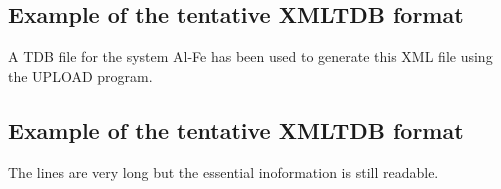 \documentclass[12pt]{article}
\begin{document}
\begin{appendices}
\setcounter{equation}{0}
\renewcommand{\theequation}{D\arabic{equation}}
\setcounter{figure}{0}
\renewcommand{\thefigure}{D\arabic{figure}}
\section{Example of the tentative XMLTDB format}\label{sc:alfe}

A TDB file for the system Al-Fe has been used to generate this XML
file using the UPLOAD program.

\subsection{Example of the tentative XMLTDB format}

The lines are very long but the essential inoformation is still
readable.


\end{appendices}
\end{document}
